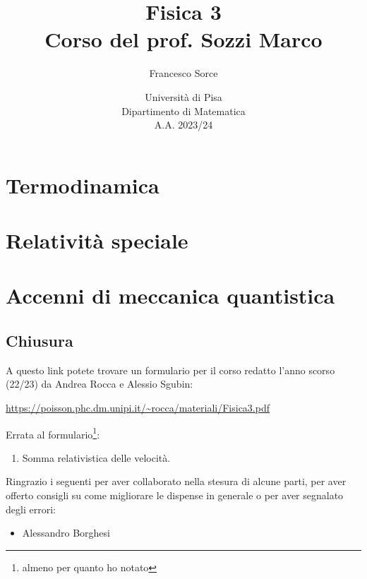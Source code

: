 \documentclass[a4paper]{report}
\title{Fisica 3\\
\large Corso del prof. Sozzi Marco}
\author{Francesco Sorce}
\date{Università di Pisa\\
Dipartimento di Matematica\\
A.A. 2023/24}
\begin{document}
\maketitle

\tableofcontents
\newpage


\part{Termodinamica}








\part{Relativit\`a speciale}




\part{Accenni di meccanica quantistica}






\appendix


\chapter{Chiusura}
A questo link potete trovare un formulario per il corso redatto l'anno scorso (22/23) da Andrea Rocca e Alessio Sgubin:
\begin{center}
\url{https://poisson.phc.dm.unipi.it/~rocca/materiali/Fisica3.pdf}
\end{center}

\bigskip 

\noindent Errata al formulario\footnote{almeno per quanto ho notato}:
\begin{enumerate}
\item Somma relativistica delle velocit\`a.
\end{enumerate}


\newpage
\noindent
Ringrazio i seguenti per aver collaborato nella stesura di alcune parti, per aver offerto consigli su come migliorare le dispense in generale o per aver segnalato degli errori:
\begin{itemize}
\item Alessandro Borghesi
\end{itemize}
\end{document}
